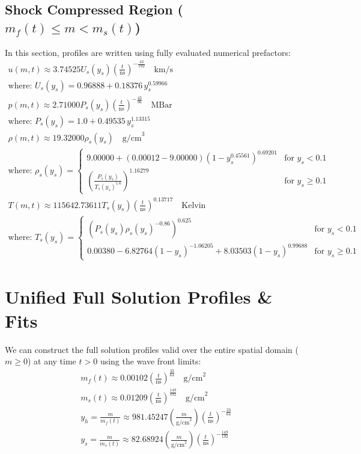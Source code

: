 \documentclass[11pt]{article}
\begin{document}
\subsection{Shock Compressed Region ($m_f(t) \le m < m_s(t)$)}
In this section, profiles are written using fully evaluated numerical prefactors:
\begin{gather}
    u(m,t) \approx 3.74525 U_s(y_s) \left(\frac{t}{\text{ns}}\right)^{-\frac{43}{192}} \quad \text{km/s} \\
    \text{where: } U_s(y_s) = 0.96888 + 0.18376 \, y_s^{0.59966} \nonumber \\
    p(m,t) \approx 2.71000 P_s(y_s) \left(\frac{t}{\text{ns}}\right)^{-\frac{43}{96}} \quad \text{MBar} \\
    \text{where: } P_s(y_s) = 1.0 + 0.49535 \, y_s^{1.13315} \nonumber \\
    \rho(m,t) \approx 19.32000 \rho_s(y_s) \quad \text{g/cm}^3 \\
    \text{where: } \rho_s(y_s) = \begin{cases}
        9.00000 + (0.00012 - 9.00000) (1 - y_s^{0.45561})^{0.69201} & \text{for } y_s < 0.1 \\
        \left( \frac{P_s(y_s)}{T_s(y_s)^{1.6}} \right)^{1.16279} & \text{for } y_s \ge 0.1
    \end{cases} \nonumber \\
    T(m,t) \approx 115642.73611 T_s(y_s) \left(\frac{t}{\text{ns}}\right)^{0.13717} \quad \text{Kelvin} \\
    \text{where: } T_s(y_s) = \begin{cases}
        \left( P_s(y_s) \rho_s(y_s)^{-0.86} \right)^{0.625} & \text{for } y_s < 0.1 \\
        0.00380 - 6.82764 (1 - y_s)^{-1.06205} + 8.03503 (1 - y_s)^{0.99688} & \text{for } y_s \ge 0.1
    \end{cases} \nonumber
\end{gather}

\newpage
\section{Unified Full Solution Profiles \& Fits}
We can construct the full solution profiles valid over the entire spatial domain ($m \ge 0$) at any time $t > 0$ using the wave front limits:
\begin{gather}
    m_f(t) \approx 0.00102 \left(\frac{t}{\text{ns}}\right)^{\frac{33}{64}} \quad \text{g/cm}^2 \\
    m_s(t) \approx 0.01209 \left(\frac{t}{\text{ns}}\right)^{\frac{149}{192}} \quad \text{g/cm}^2 \\
    y_h = \frac{m}{m_f(t)} \approx 981.45247 \left(\frac{m}{\text{g/cm}^2}\right) \left(\frac{t}{\text{ns}}\right)^{-\frac{33}{64}} \\
    y_s = \frac{m}{m_s(t)} \approx 82.68924 \left(\frac{m}{\text{g/cm}^2}\right) \left(\frac{t}{\text{ns}}\right)^{-\frac{149}{192}}
\end{gather}
\end{document}
